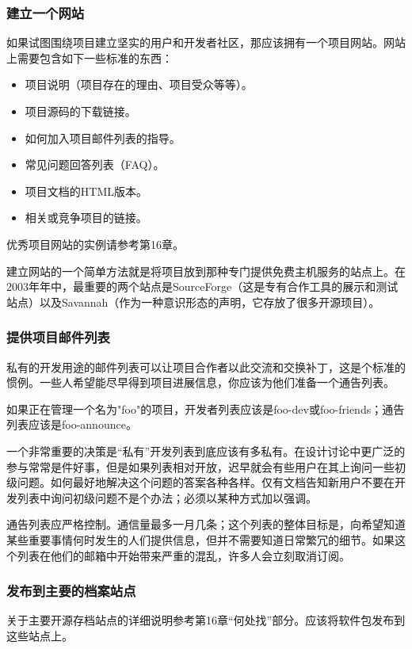 \documentclass[12pt,oneside]{book}
\begin{document}
\subsubsection{建立一个网站}
如果试图围绕项目建立坚实的用户和开发者社区，那应该拥有一个项目网站。网站上需要包含如下一些标准的东西：
\begin{itemize}
\item 项目说明（项目存在的理由、项目受众等等）。
\item 项目源码的下载链接。
\item 如何加入项目邮件列表的指导。
\item 常见问题回答列表（FAQ）。
\item 项目文档的HTML版本。
\item 相关或竞争项目的链接。
\end{itemize}

优秀项目网站的实例请参考第16章。

建立网站的一个简单方法就是将项目放到那种专门提供免费主机服务的站点上。在2003年年中，最重要的两个站点是SourceForge（这是专有合作工具的展示和测试站点）以及Savannah（作为一种意识形态的声明，它存放了很多开源顼目）。

\subsubsection{提供项目邮件列表}
私有的开发用途的邮件列表可以让项目合作者以此交流和交换补丁，这是个标准的惯例。一些人希望能尽早得到项目进展信息，你应该为他们准备一个通告列表。

如果正在管理一个名为"foo"的项目，开发者列表应该是foo-dev或foo-friends；通告列表应该是foo-announce。

一个非常重要的决策是“私有”开发列表到底应该有多私有。在设计讨论中更广泛的参与常常是件好事，但是如果列表相对开放，迟早就会有些用户在其上询问一些初级问题。如何最好地解决这个问题的答案各种各样。仅有文档告知新用户不要在开发列表中询问初级问题不是个办法；必须以某种方式加以强调。

通告列表应严格控制。通信量最多一月几条；这个列表的整体目标是，向希望知道某些重要事情何时发生的人们提供信息，但并不需要知道日常繁冗的细节。如果这个列表在他们的邮箱中开始带来严重的混乱，许多人会立刻取消订阅。

\subsubsection{发布到主要的档案站点}
关于主要开源存档站点的详细说明参考第16章“何处找”部分。应该将软件包发布到这些站点上。
\end{document}
